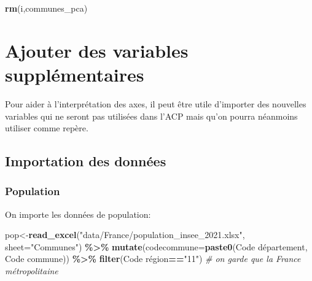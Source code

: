 \documentclass[
]{book}
\newenvironment{Shaded}{\begin{snugshade}}{\end{snugshade}}
\newcommand{\AttributeTok}[1]{\textcolor[rgb]{0.13,0.29,0.53}{#1}}
\newcommand{\CommentTok}[1]{\textcolor[rgb]{0.56,0.35,0.01}{\textit{#1}}}
\newcommand{\FunctionTok}[1]{\textcolor[rgb]{0.13,0.29,0.53}{\textbf{#1}}}
\newcommand{\NormalTok}[1]{#1}
\newcommand{\OtherTok}[1]{\textcolor[rgb]{0.56,0.35,0.01}{#1}}
\newcommand{\SpecialCharTok}[1]{\textcolor[rgb]{0.81,0.36,0.00}{\textbf{#1}}}
\newcommand{\StringTok}[1]{\textcolor[rgb]{0.31,0.60,0.02}{#1}}
\begin{document}
\begin{Shaded}
\begin{Highlighting}[]
\FunctionTok{rm}\NormalTok{(i,communes\_pca)}
\end{Highlighting}
\end{Shaded}

\hypertarget{ajouter-des-variables-suppluxe9mentaires}{%
\section{Ajouter des variables supplémentaires}\label{ajouter-des-variables-suppluxe9mentaires}}

Pour aider à l'interprétation des axes, il peut être utile d'importer des nouvelles variables qui ne seront pas utilisées dans l'ACP mais qu'on pourra néanmoins utiliser comme repère.

\hypertarget{importation-des-donnuxe9es-1}{%
\subsection{Importation des données}\label{importation-des-donnuxe9es-1}}

\hypertarget{population}{%
\subsubsection{Population}\label{population}}

On importe les données de population:

\begin{Shaded}
\begin{Highlighting}[]
\NormalTok{pop}\OtherTok{\textless{}{-}}\FunctionTok{read\_excel}\NormalTok{(}\StringTok{"data/France/population\_insee\_2021.xlsx"}\NormalTok{, }\AttributeTok{sheet=}\StringTok{"Communes"}\NormalTok{) }\SpecialCharTok{\%\textgreater{}\%}
  \FunctionTok{mutate}\NormalTok{(}\AttributeTok{codecommune=}\FunctionTok{paste0}\NormalTok{(}\StringTok{\textasciigrave{}}\AttributeTok{Code département}\StringTok{\textasciigrave{}}\NormalTok{, }\StringTok{\textasciigrave{}}\AttributeTok{Code commune}\StringTok{\textasciigrave{}}\NormalTok{)) }\SpecialCharTok{\%\textgreater{}\%}
  \FunctionTok{filter}\NormalTok{(}\StringTok{\textasciigrave{}}\AttributeTok{Code région}\StringTok{\textasciigrave{}}\SpecialCharTok{==}\StringTok{"11"}\NormalTok{) }\CommentTok{\# on garde que la France métropolitaine}
\end{Highlighting}
\end{Shaded}
\end{document}
